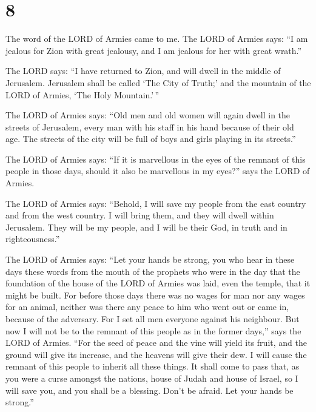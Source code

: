 \hypertarget{section-7}{%
\section{8}\label{section-7}}

 The word of the LORD of Armies came to me. 
The LORD of Armies says: ``I am jealous for Zion with great jealousy,
and I am jealous for her with great wrath.''

 The LORD says: ``I have returned to Zion, and will dwell
in the middle of Jerusalem. Jerusalem shall be called `The City of
Truth;' and the mountain of the LORD of Armies, `The Holy Mountain.'\,''

 The LORD of Armies says: ``Old men and old women will
again dwell in the streets of Jerusalem, every man with his staff in his
hand because of their old age.  The streets of the city
will be full of boys and girls playing in its streets.''

 The LORD of Armies says: ``If it is marvellous in the
eyes of the remnant of this people in those days, should it also be
marvellous in my eyes?'' says the LORD of Armies.

 The LORD of Armies says: ``Behold, I will save my people
from the east country and from the west country.  I will
bring them, and they will dwell within Jerusalem. They will be my
people, and I will be their God, in truth and in righteousness.''

 The LORD of Armies says: ``Let your hands be strong, you
who hear in these days these words from the mouth of the prophets who
were in the day that the foundation of the house of the LORD of Armies
was laid, even the temple, that it might be built.  For
before those days there was no wages for man nor any wages for an
animal, neither was there any peace to him who went out or came in,
because of the adversary. For I set all men everyone against his
neighbour.  But now I will not be to the remnant of this
people as in the former days,'' says the LORD of Armies. 
``For the seed of peace and the vine will yield its fruit, and the
ground will give its increase, and the heavens will give their dew. I
will cause the remnant of this people to inherit all these things.
 It shall come to pass that, as you were a curse amongst
the nations, house of Judah and house of Israel, so I will save you, and
you shall be a blessing. Don't be afraid. Let your hands be strong.''

